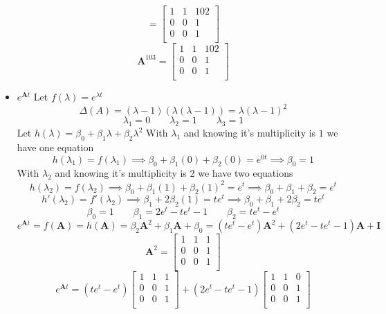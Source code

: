 \documentclass{article}
\begin{document}
\begin{itemize}
$$=
\begin{bmatrix}
1 & 1 & 102 \\
0 & 0 & 1 \\
0 & 0 & 1 \\
\end{bmatrix}
$$
$$
\mathbf{A}^{103}
=
\begin{bmatrix}
1 & 1 & 102 \\
0 & 0 & 1 \\
0 & 0 & 1 \\
\end{bmatrix}
$$
\item $e^{\mathbf{A}t}$
\newline
Let $f(\lambda) = e^{\lambda t}$
$$\Delta(A) = (\lambda-1)(\lambda(\lambda-1)) = \lambda(\lambda-1)^2 $$
$$ \lambda_1 = 0 \qquad \lambda_2 = 1 \qquad \lambda_3 = 1 $$
Let $h(\lambda) = \beta_0 + \beta_1\lambda + \beta_2\lambda^2$
\newline
With $\lambda_1$ and knowing it's multiplicity is $1$ we have one equation
$$ h(\lambda_1) = f(\lambda_1) \implies \beta_0 + \beta_1(0) + \beta_2(0) = e^{0t} \implies \beta_0 = 1 $$
With $\lambda_2$ and knowing it's multiplicity is $2$ we have two equations
$$ h(\lambda_2) = f(\lambda_2) \implies \beta_0 + \beta_1(1) + \beta_2(1)^2 = e^{t} \implies \beta_0 + \beta_1 + \beta_2 = e^{t} $$
$$ h'(\lambda_2) = f'(\lambda_2) \implies \beta_1 + 2\beta_2(1) = te^{t} \implies \beta_0 + \beta_1 + 2\beta_2 = te^{t} $$
$$ \beta_0 = 1 \qquad \beta_1 = 2e^t-te^t-1 \qquad \beta_2 = te^t - e^t $$
$$ e^{\mathbf{A}t} = f(\mathbf{A}) = h(\mathbf{A}) = \beta_2\mathbf{A}^2 + \beta_1\mathbf{A} + \beta_0 = (te^t - e^t)\mathbf{A}^2 + (2e^t-te^t-1)\mathbf{A} + \mathbf{I} $$
$$
\mathbf{A}^2
=
\begin{bmatrix}
1 & 1 & 1 \\
0 & 0 & 1 \\
0 & 0 & 1 \\
\end{bmatrix}
$$
$$
e^{\mathbf{A}t}
=
(te^t - e^t)
\begin{bmatrix}
1 & 1 & 1 \\
0 & 0 & 1 \\
0 & 0 & 1 \\
\end{bmatrix}
+
(2e^t-te^t-1)
\begin{bmatrix}
1 & 1 & 0 \\
0 & 0 & 1 \\
0 & 0 & 1 \\
\end{bmatrix}
$$
\end{itemize}
\end{document}
